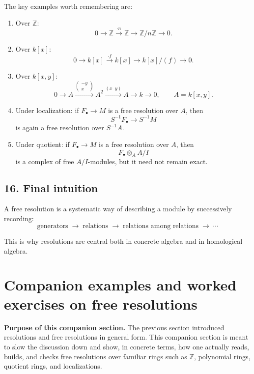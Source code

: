 \documentclass[12pt,a4paper]{article}
\theoremstyle{notespace}
\theoremstyle{definition}
\begin{document}
The key examples worth remembering are:

\begin{enumerate}
	\item Over \(\mathbb Z\):
	\[
	0 \longrightarrow \mathbb Z \xrightarrow{\cdot n} \mathbb Z \longrightarrow \mathbb Z/n\mathbb Z \longrightarrow 0.
	\]
	
	\item Over \(k[x]\):
	\[
	0 \longrightarrow k[x] \xrightarrow{\cdot f} k[x] \longrightarrow k[x]/(f) \longrightarrow 0.
	\]
	
	\item Over \(k[x,y]\):
	\[
	0 \longrightarrow A \xrightarrow{\begin{pmatrix}-y\\x\end{pmatrix}} A^2
	\xrightarrow{(x\;\;y)} A \longrightarrow k \longrightarrow 0,
	\qquad A=k[x,y].
	\]
	
	\item Under localization:
	if \(F_\bullet \to M\) is a free resolution over \(A\), then
	\[
	S^{-1}F_\bullet \to S^{-1}M
	\]
	is again a free resolution over \(S^{-1}A\).
	
	\item Under quotient:
	if \(F_\bullet \to M\) is a free resolution over \(A\), then
	\[
	F_\bullet \otimes_A A/I
	\]
	is a complex of free \(A/I\)-modules, but it need not remain exact.
\end{enumerate}

\subsection{16. Final intuition}

A free resolution is a systematic way of describing a module by successively recording:
\[
\text{generators} \;\to\; \text{relations} \;\to\; \text{relations among relations} \;\to\; \cdots
\]

This is why resolutions are central both in concrete algebra and in homological algebra.


\section{Companion examples and worked exercises on free resolutions}

\textbf{Purpose of this companion section.}
The previous section introduced resolutions and free resolutions in general form.
This companion section is meant to slow the discussion down and show, in concrete terms, how one actually reads, builds, and checks free resolutions over familiar rings such as \(\mathbb Z\), polynomial rings, quotient rings, and localizations.
\end{document}
